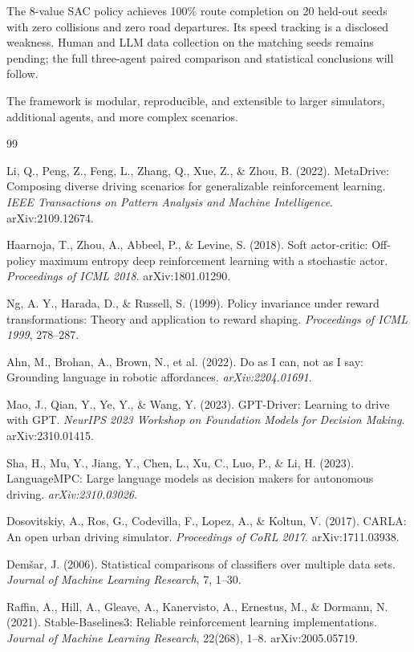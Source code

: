 \documentclass[12pt,a4paper]{report}
\begin{document}
The 8-value SAC policy achieves 100\% route completion on 20 held-out seeds with zero collisions and zero road departures. Its speed tracking is a disclosed weakness. Human and LLM data collection on the matching seeds remains pending; the full three-agent paired comparison and statistical conclusions will follow.

The framework is modular, reproducible, and extensible to larger simulators, additional agents, and more complex scenarios.

\begin{thebibliography}{99}

Li, Q., Peng, Z., Feng, L., Zhang, Q., Xue, Z., \& Zhou, B. (2022).
MetaDrive: Composing diverse driving scenarios for generalizable reinforcement learning.
\textit{IEEE Transactions on Pattern Analysis and Machine Intelligence}. arXiv:2109.12674.

Haarnoja, T., Zhou, A., Abbeel, P., \& Levine, S. (2018).
Soft actor-critic: Off-policy maximum entropy deep reinforcement learning with a stochastic actor.
\textit{Proceedings of ICML 2018}. arXiv:1801.01290.

Ng, A. Y., Harada, D., \& Russell, S. (1999).
Policy invariance under reward transformations: Theory and application to reward shaping.
\textit{Proceedings of ICML 1999}, 278--287.

Ahn, M., Brohan, A., Brown, N., et al. (2022).
Do as I can, not as I say: Grounding language in robotic affordances.
\textit{arXiv:2204.01691}.

Mao, J., Qian, Y., Ye, Y., \& Wang, Y. (2023).
GPT-Driver: Learning to drive with GPT.
\textit{NeurIPS 2023 Workshop on Foundation Models for Decision Making}. arXiv:2310.01415.

Sha, H., Mu, Y., Jiang, Y., Chen, L., Xu, C., Luo, P., \& Li, H. (2023).
LanguageMPC: Large language models as decision makers for autonomous driving.
\textit{arXiv:2310.03026}.

Dosovitskiy, A., Ros, G., Codevilla, F., Lopez, A., \& Koltun, V. (2017).
CARLA: An open urban driving simulator.
\textit{Proceedings of CoRL 2017}. arXiv:1711.03938.

Dem\v{s}ar, J. (2006).
Statistical comparisons of classifiers over multiple data sets.
\textit{Journal of Machine Learning Research}, 7, 1--30.

Raffin, A., Hill, A., Gleave, A., Kanervisto, A., Ernestus, M., \& Dormann, N. (2021).
Stable-Baselines3: Reliable reinforcement learning implementations.
\textit{Journal of Machine Learning Research}, 22(268), 1--8. arXiv:2005.05719.

\end{thebibliography}
\end{document}
